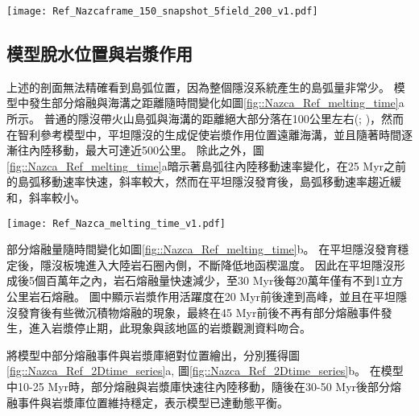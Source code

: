\begin{figure*}[htp]
    \centering
    \texttt{[image: Ref\_Nazcaframe\_150\_snapshot\_5field\_200\_v1.pdf]}
    \caption[智利參考模型於30 Myr時之結果。]{智利參考模型於30 Myr時之結果。}
    \label{fig::Nazca_Ref_150}
\end{figure*}
\newpage
\subsection{模型脫水位置與岩漿作用}
上述的剖面無法精確看到島弧位置，因為整個隱沒系統產生的島弧量非常少。
模型中發生部分熔融與海溝之距離隨時間變化如圖\ref{fig::Nazca_Ref_melting_time}a所示。
普通的隱沒帶火山島弧與海溝的距離絕大部分落在100公里左右(\citealp{peacock1990fluid}; \citealp{hyndman2003serpentinization})，然而在智利參考模型中，平坦隱沒的生成促使岩漿作用位置遠離海溝，並且隨著時間逐漸往內陸移動，最大可達近500公里。
除此之外，圖\ref{fig::Nazca_Ref_melting_time}a暗示著島弧往內陸移動速率變化，在25 Myr之前的島弧移動速率快速，斜率較大，然而在平坦隱沒發育後，島弧移動速率趨近緩和，斜率較小。


\begin{figure*}[hb]
    \centering
    \texttt{[image: Ref\_Nazca\_melting\_time\_v1.pdf]}
    \caption[智利參考模型岩漿作用隨時間變化]{智利參考模型岩漿作用隨時間變化，灰色底標出平坦隱沒發育後時間段。(a)部分熔融與海溝之距離隨時間變化圖，縱軸中每個點代表每次部分熔融發生位置，顏色為指數上的部分熔融比例。(b)岩石熔融量隨時間變化圖，熔融量單位為每單位海溝產生之立方公里量中每20萬年瞬時量。顏色代表不同岩相。}
    \label{fig::Nazca_Ref_melting_time}
\end{figure*}

部分熔融量隨時間變化如圖\ref{fig::Nazca_Ref_melting_time}b。
在平坦隱沒發育穩定後，隱沒板塊進入大陸岩石圈內側，不斷降低地函楔溫度。
因此在平坦隱沒形成後5個百萬年之內，岩石熔融量快速減少，至30 Myr後每20萬年僅有不到1立方公里岩石熔融。
圖中顯示岩漿作用活躍度在20 Myr前後達到高峰，並且在平坦隱沒發育後有些微沉積物熔融的現象，最終在45 Myr前後不再有部分熔融事件發生，進入岩漿停止期，此現象與該地區的岩漿觀測資料吻合。

將模型中部分熔融事件與岩漿庫絕對位置繪出，分別獲得圖\ref{fig::Nazca_Ref_2Dtime_series}a, 圖\ref{fig::Nazca_Ref_2Dtime_series}b。
在模型中10-25 Myr時，部分熔融與岩漿庫快速往內陸移動，隨後在30-50 Myr後部分熔融事件與岩漿庫位置維持穩定，表示模型已達動態平衡。

